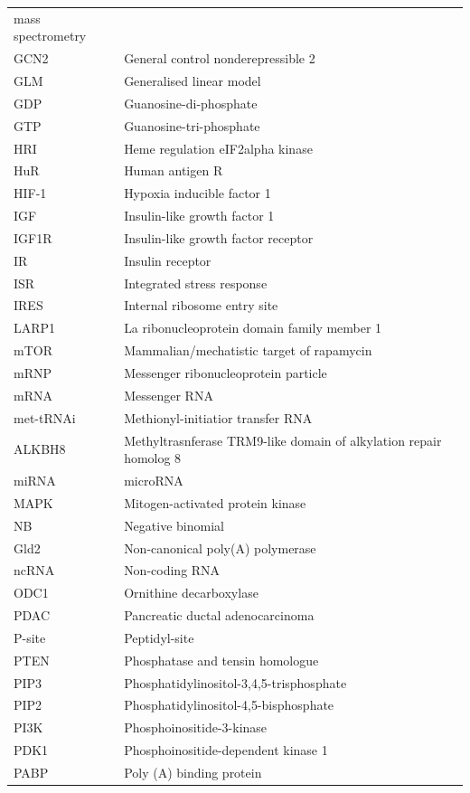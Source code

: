 \documentclass[
  12pt,
  openany]{book}
\begin{document}
\begin{longtable}{ll}
mass spectrometry\\
GCN2 & General control nonderepressible 2\\
\addlinespace
GLM & Generalised linear model\\
GDP & Guanosine-di-phosphate\\
GTP & Guanosine-tri-phosphate\\
HRI & Heme regulation eIF2alpha kinase\\
HuR & Human antigen R\\
\addlinespace
HIF-1 & Hypoxia inducible factor 1\\
IGF & Insulin-like growth factor 1\\
IGF1R & Insulin-like growth factor receptor\\
IR & Insulin receptor\\
ISR & Integrated stress response\\
\addlinespace
IRES & Internal ribosome entry site\\
LARP1 & La ribonucleoprotein domain family member 1\\
mTOR & Mammalian/mechatistic target of rapamycin\\
mRNP & Messenger ribonucleoprotein particle\\
mRNA & Messenger RNA\\
\addlinespace
met-tRNAi & Methionyl-initiatior transfer RNA\\
ALKBH8 & Methyltrasnferase TRM9-like domain of alkylation repair homolog 8\\
miRNA & microRNA\\
MAPK & Mitogen-activated protein
kinase\\
NB & Negative binomial\\
\addlinespace
Gld2 & Non-canonical poly(A) polymerase\\
ncRNA & Non-coding RNA\\
ODC1 & Ornithine decarboxylase\\
PDAC & Pancreatic ductal adenocarcinoma\\
P-site & Peptidyl-site\\
\addlinespace
PTEN & Phosphatase and tensin homologue\\
PIP3 & Phosphatidylinositol-3,4,5-trisphosphate\\
PIP2 & Phosphatidylinositol-4,5-bisphosphate\\
PI3K & Phosphoinositide-3-kinase\\
PDK1 & Phosphoinositide-dependent kinase 1\\
\addlinespace
PABP & Poly (A) binding protein\\

\end{longtable}
\end{document}
